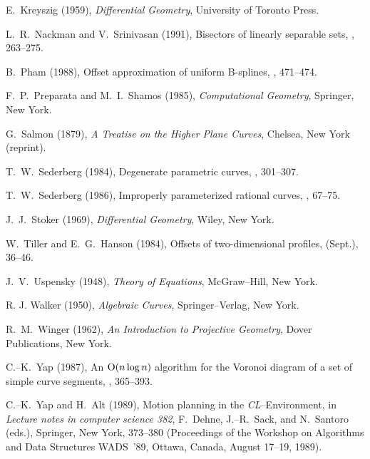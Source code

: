 \begin{thebibliography}{99}
E.~Kreyszig (1959), {\it Differential Geometry}, University of
Toronto Press.

L.~R.~Nackman and V.~Srinivasan (1991), Bisectors of linearly
separable sets, , 263--275.

B.~Pham (1988), Offset approximation of uniform B-splines,
, 471--474.

F.~P.~Preparata and M.~I.~Shamos (1985), {\it Computational
Geometry}, Springer, New York.

G.~Salmon (1879), {\it A Treatise on the Higher Plane Curves},
Chelsea, New York (reprint).

T.~W.~Sederberg (1984), Degenerate parametric curves, ,
301--307.

T.~W.~Sederberg (1986), Improperly parameterized rational curves,
, 67--75.

J.~J.~Stoker (1969), {\it Differential Geometry}, Wiley, New York.

W.~Tiller and E.~G.~Hanson (1984), Offsets of two-dimensional
profiles,  (Sept.), 36--46.

J.~V.~Uspensky (1948), {\it Theory of Equations}, McGraw--Hill,
New York.

R. J. Walker (1950),
{\it Algebraic Curves},
Springer--Verlag, New York.

R.~M.~Winger (1962), {\it An Introduction to Projective Geometry},
Dover Publications, New York.

C.--K.~Yap (1987), An ${\rm O}(n\log n)$ algorithm for the Voronoi
diagram of a set of simple curve segments, , 365--393.

C.--K.~Yap and H.~Alt (1989), Motion planning in the {\it
CL\/}--Environment, in {\it Lecture notes in computer science 382},
F.~Dehne, J.--R.~Sack, and N.~Santoro (eds.), Springer, New York,
373--380 (Proceedings of the Workshop on Algorithms and Data
Structures WADS~'89, Ottawa, Canada, August 17--19, 1989).

\end{thebibliography}



